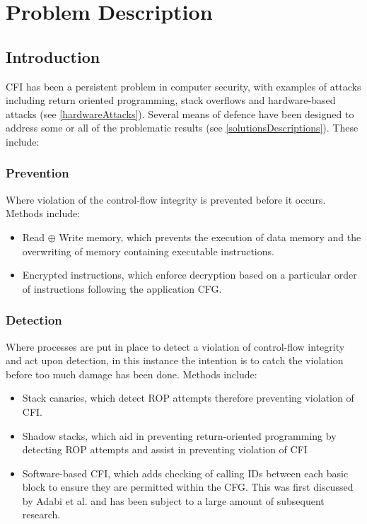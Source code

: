 \section{Problem Description}
\subsection{Introduction}

CFI has been a persistent problem in computer security, with examples of attacks including return oriented programming, stack overflows and hardware-based attacks (see \ref{hardwareAttacks}). Several means of defence have been designed to address some or all of the problematic results (see \ref{solutionsDescriptions}). These include:

\subsubsection*{Prevention}
Where violation of the control-flow integrity is prevented before it occurs. Methods include:
\begin{itemize}
	\item Read $\oplus$ Write memory, which prevents the execution of data memory and the overwriting of memory containing executable instructions.
	\item Encrypted instructions, which enforce decryption based on a particular order of instructions following the application CFG.
\end{itemize}

\subsubsection*{Detection}
Where processes are put in place to detect a violation of control-flow integrity and act upon detection, in this instance the intention is to catch the violation before too much damage has been done. Methods include:
\begin{itemize}
	\item Stack canaries, which detect ROP attempts therefore preventing violation of CFI.
	\item Shadow stacks, which aid in preventing return-oriented programming by detecting ROP attempts and assist in preventing violation of CFI
	\item Software-based CFI, which adds checking of calling IDs between each basic block to ensure they are permitted within the CFG. This was first discussed by Adabi et al. \cite{Abadi2005} and has been subject to a large amount of subsequent research.
\end{itemize}

